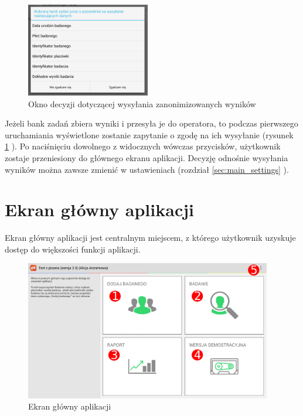 \documentclass[a4paper,10pt,twosided]{book}
\newcommand{\refwithpage}[3]{
\ref{#1}\ifthenelse{\equal{\thepage}{\pageref{#1}}}{}{#2\pageref{#1}#3}%
}
\newcommand{\ppref}[1]{\refwithpage{#1}{ -- strona }{}}
\begin{document}
\begin{figure}
\includegraphics[width=0.48\textwidth]{activity_suite_select-result_submit_approval_request.png}
\caption{Okno decyzji dotyczącej wysyłania zanonimizowanych wyników}
\vspace{-1em}
\label{fig:suiteselect_sendresults}
\end{figure}

\vspace{1em}
Jeżeli bank zadań zbiera wyniki i przesyła je do operatora, to podczas pierwszego uruchamiania wyświetlone zostanie zapytanie o zgodę na ich wysyłanie (rysunek \ppref{fig:suiteselect_sendresults}). Po naciśnięciu dowolnego z widocznych wówczas przycisków, użytkownik zostaje przeniesiony do głównego ekranu aplikacji. Decyzję odnośnie wysyłania wyników można zawsze zmienić w ustawieniach (rozdział \ppref{sec:main_settings}).

\chapter{Ekran główny aplikacji}
\label{chap:main}

Ekran główny aplikacji jest centralnym miejscem, z którego użytkownik uzyskuje dostęp do większości funkcji aplikacji.

\begin{figure}[b!]
\includegraphics[width=0.96\textwidth]{activity_main.pdf}
\caption{Ekran główny aplikacji}
\label{fig:main}
\end{figure}
\end{document}
